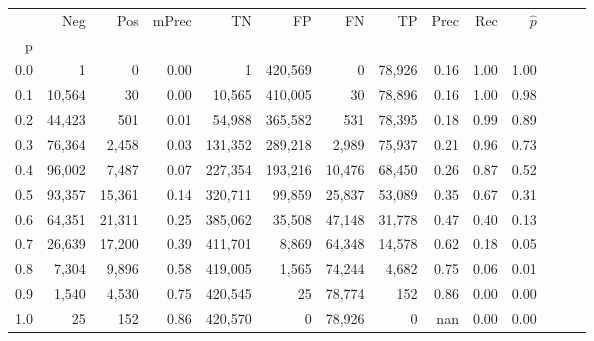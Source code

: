 \begin{tabular}{rrrrrrrrrrrrrr}
\toprule
{} &     Neg &     Pos & mPrec &       TN &       FP &      FN &      TP &  Prec &   Rec & $\hat{p}$ \\
p   &         &         &       &          &          &         &         &       &       &           \\
\midrule
0.0 &       1 &       0 &  0.00 &        1 &  420,569 &       0 &  78,926 &  0.16 &  1.00 &      1.00 \\
0.1 &  10,564 &      30 &  0.00 &   10,565 &  410,005 &      30 &  78,896 &  0.16 &  1.00 &      0.98 \\
0.2 &  44,423 &     501 &  0.01 &   54,988 &  365,582 &     531 &  78,395 &  0.18 &  0.99 &      0.89 \\
0.3 &  76,364 &   2,458 &  0.03 &  131,352 &  289,218 &   2,989 &  75,937 &  0.21 &  0.96 &      0.73 \\
0.4 &  96,002 &   7,487 &  0.07 &  227,354 &  193,216 &  10,476 &  68,450 &  0.26 &  0.87 &      0.52 \\
0.5 &  93,357 &  15,361 &  0.14 &  320,711 &   99,859 &  25,837 &  53,089 &  0.35 &  0.67 &      0.31 \\
0.6 &  64,351 &  21,311 &  0.25 &  385,062 &   35,508 &  47,148 &  31,778 &  0.47 &  0.40 &      0.13 \\
0.7 &  26,639 &  17,200 &  0.39 &  411,701 &    8,869 &  64,348 &  14,578 &  0.62 &  0.18 &      0.05 \\
0.8 &   7,304 &   9,896 &  0.58 &  419,005 &    1,565 &  74,244 &   4,682 &  0.75 &  0.06 &      0.01 \\
0.9 &   1,540 &   4,530 &  0.75 &  420,545 &       25 &  78,774 &     152 &  0.86 &  0.00 &      0.00 \\
1.0 &      25 &     152 &  0.86 &  420,570 &        0 &  78,926 &       0 &   nan &  0.00 &      0.00 \\
\bottomrule
\end{tabular}
